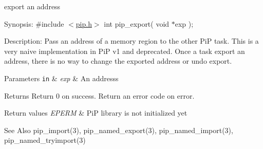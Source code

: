 export an address

\begin{DoxyParagraph}{Synopsis\-:}
\#include $<$\hyperlink{pip_8h_source}{pip.\-h}$>$ int pip\-\_\-export( void $\ast$exp );
\end{DoxyParagraph}
\begin{DoxyParagraph}{Description\-:}
Pass an address of a memory region to the other Pi\-P task. This is a very naive implementation in Pi\-P v1 and deprecated. Once a task export an address, there is no way to change the exported address or undo export.
\end{DoxyParagraph}

\begin{DoxyParams}[1]{Parameters}
\mbox{\tt in}  & {\em exp} & An addresss\\
\hline
\end{DoxyParams}
\begin{DoxyReturn}{Returns}
Return 0 on success. Return an error code on error. 
\end{DoxyReturn}

\begin{DoxyRetVals}{Return values}
{\em E\-P\-E\-R\-M} & Pi\-P library is not initialized yet\\
\hline
\end{DoxyRetVals}
\begin{DoxySeeAlso}{See Also}
pip\-\_\-import(3), pip\-\_\-named\-\_\-export(3), pip\-\_\-named\-\_\-import(3), pip\-\_\-named\-\_\-tryimport(3) 
\end{DoxySeeAlso}
